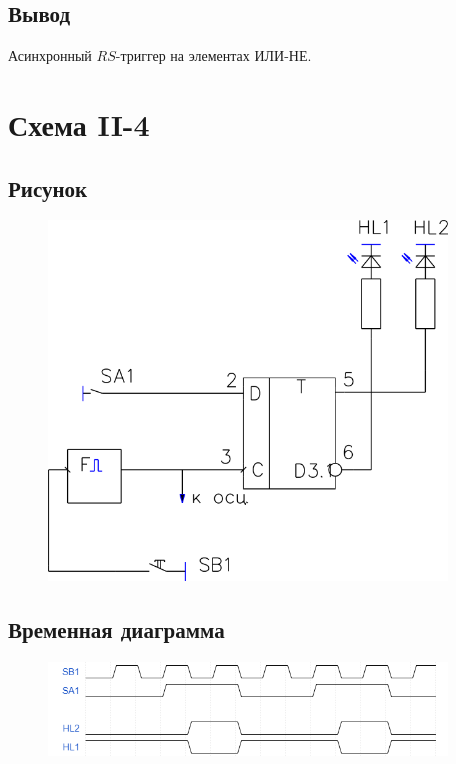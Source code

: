 \documentclass[a4paper]{article}
\begin{document}
\subsection{Вывод}
Асинхронный $RS$-триггер на элементах ИЛИ-НЕ.


\section{Схема II-4}

\subsection{Рисунок}
\begin{figure}[H]
    \centering
    \includegraphics[width=300pt]{s4.png}
\end{figure}


\subsection{Временная диаграмма}
\begin{figure}[H]
    \centering
    \includegraphics[width=300pt]{d4.png}
\end{figure}
\end{document}
